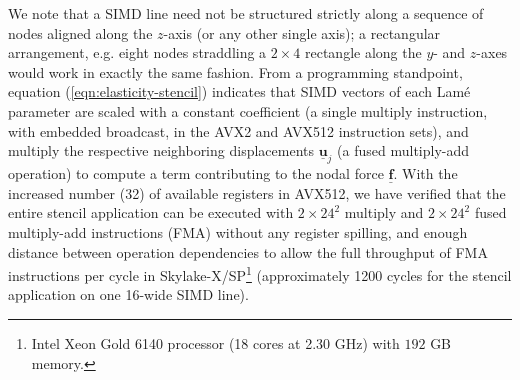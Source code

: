 We note that a SIMD line need not be structured strictly along a sequence of nodes aligned along the $z$-axis (or any other single axis); a rectangular arrangement, e.g. eight nodes straddling a $2\times 4$ rectangle along the $y$- and $z$-axes would work in exactly the same fashion. From a programming standpoint, equation (\ref{eqn:elasticity-stencil}) indicates that SIMD vectors of each Lam\'{e} parameter are scaled with a constant coefficient (a single multiply instruction, with embedded broadcast, in the AVX2 and AVX512 instruction sets), and multiply the respective neighboring displacements $\underline{\mathbf{u}}_j$ (a fused multiply-add operation) to compute a term contributing to
the nodal force $\underline{\mathbf{f}}$. With the increased number (32) of available registers in AVX512, we have verified that the entire stencil application can be executed with $2\times
24^2$ multiply and $2\times 24^2$ fused multiply-add instructions (FMA) without any register spilling, and enough distance between operation dependencies to allow the full throughput of 
FMA instructions per cycle in Skylake-X/SP\footnote{Intel Xeon Gold 6140 processor (18 cores at 2.30 GHz) with $192$ GB memory.} (approximately 1200 cycles for the stencil application on one 16-wide SIMD line).

